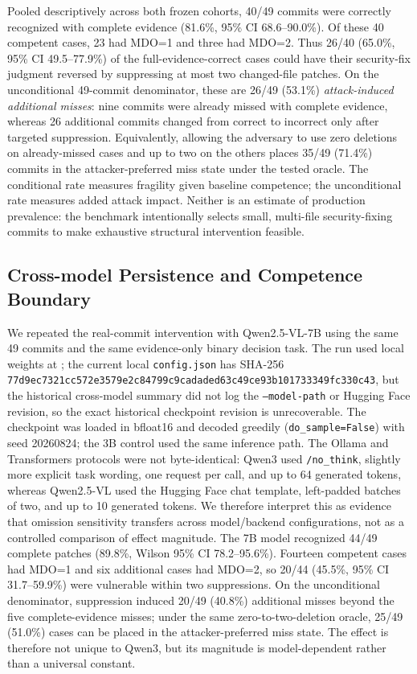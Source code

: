 \documentclass[journal,compsoc]{IEEEtran}
\begin{document}
Pooled descriptively across both frozen cohorts, 40/49 commits were correctly recognized with complete evidence (81.6\%, 95\% CI 68.6--90.0\%). Of these 40 competent cases, 23 had MDO=1 and three had MDO=2. Thus 26/40 (65.0\%, 95\% CI 49.5--77.9\%) of the full-evidence-correct cases could have their security-fix judgment reversed by suppressing at most two changed-file patches. On the unconditional 49-commit denominator, these are 26/49 (53.1\%) \emph{attack-induced additional misses}: nine commits were already missed with complete evidence, whereas 26 additional commits changed from correct to incorrect only after targeted suppression. Equivalently, allowing the adversary to use zero deletions on already-missed cases and up to two on the others places 35/49 (71.4\%) commits in the attacker-preferred miss state under the tested oracle. The conditional rate measures fragility given baseline competence; the unconditional rate measures added attack impact. Neither is an estimate of production prevalence: the benchmark intentionally selects small, multi-file security-fixing commits to make exhaustive structural intervention feasible.

\subsection{Cross-model Persistence and Competence Boundary}
We repeated the real-commit intervention with Qwen2.5-VL-7B using the same 49 commits and the same evidence-only binary decision task. The run used local weights at ; the current local \texttt{config.json} has SHA-256 \texttt{77d9ec73\allowbreak{}21cc572e\allowbreak{}3579e2c8\allowbreak{}4799c9ca\allowbreak daded63c\allowbreak{}49ce93b1\allowbreak{}01733349\allowbreak fc330c43}, but the historical cross-model summary did not log the \texttt{--model-path} or Hugging Face revision, so the exact historical checkpoint revision is unrecoverable. The checkpoint was loaded in bfloat16 and decoded greedily (\texttt{do\_sample=False}) with seed 20260824; the 3B control used the same inference path. The Ollama and Transformers protocols were not byte-identical: Qwen3 used \texttt{/no\_think}, slightly more explicit task wording, one request per call, and up to 64 generated tokens, whereas Qwen2.5-VL used the Hugging Face chat template, left-padded batches of two, and up to 10 generated tokens. We therefore interpret this as evidence that omission sensitivity transfers across model/backend configurations, not as a controlled comparison of effect magnitude. The 7B model recognized 44/49 complete patches (89.8\%, Wilson 95\% CI 78.2--95.6\%). Fourteen competent cases had MDO=1 and six additional cases had MDO=2, so 20/44 (45.5\%, 95\% CI 31.7--59.9\%) were vulnerable within two suppressions. On the unconditional denominator, suppression induced 20/49 (40.8\%) additional misses beyond the five complete-evidence misses; under the same zero-to-two-deletion oracle, 25/49 (51.0\%) cases can be placed in the attacker-preferred miss state. The effect is therefore not unique to Qwen3, but its magnitude is model-dependent rather than a universal constant.
\end{document}
